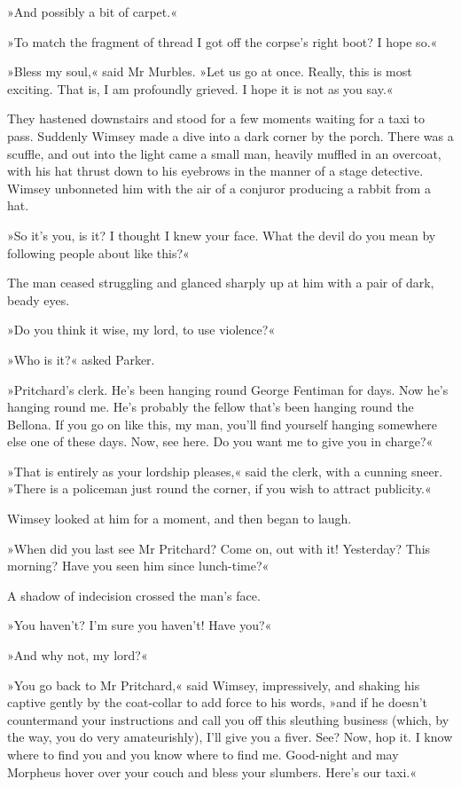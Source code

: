 »And possibly a bit of carpet.«

»To match the fragment of thread I got off the corpse's right boot? I hope so.«

»Bless my soul,« said Mr Murbles. »Let us go at once. Really, this is most exciting. That is, I am profoundly grieved. I hope it is not as you say.«

They hastened downstairs and stood for a few moments waiting for a taxi to pass. Suddenly Wimsey made a dive into a dark corner by the porch. There was a scuffle, and out into the light came a small man, heavily muffled in an overcoat, with his hat thrust down to his eyebrows in the manner of a stage detective. Wimsey unbonneted him with the air of a conjuror producing a rabbit from a hat.

»So it's you, is it? I thought I knew your face. What the devil do you mean by following people about like this?«

The man ceased struggling and glanced sharply up at him with a pair of dark, beady eyes.

»Do you think it wise, my lord, to use violence?«

»Who is it?« asked Parker.

»Pritchard's clerk. He's been hanging round George Fentiman for days. Now he's hanging round me. He's probably the fellow that's been hanging round the Bellona. If you go on like this, my man, you'll find yourself hanging somewhere else one of these days. Now, see here. Do you want me to give you in charge?«

»That is entirely as your lordship pleases,« said the clerk, with a cunning sneer. »There is a policeman just round the corner, if you wish to attract publicity.«

Wimsey looked at him for a moment, and then began to laugh.

»When did you last see Mr Pritchard? Come on, out with it! Yesterday? This morning? Have you seen him since lunch-time?«

A shadow of indecision crossed the man's face.

»You haven't? I'm sure you haven't! Have you?«

»And why not, my lord?«

»You go back to Mr Pritchard,« said Wimsey, impressively, and shaking his captive gently by the coat-collar to add force to his words, »and if he doesn't countermand your instructions and call you off this sleuthing business (which, by the way, you do very amateurishly), I'll give you a fiver. See? Now, hop it. I know where to find you and you know where to find me. Good-night and may Morpheus hover over your couch and bless your slumbers. Here's our taxi.«

